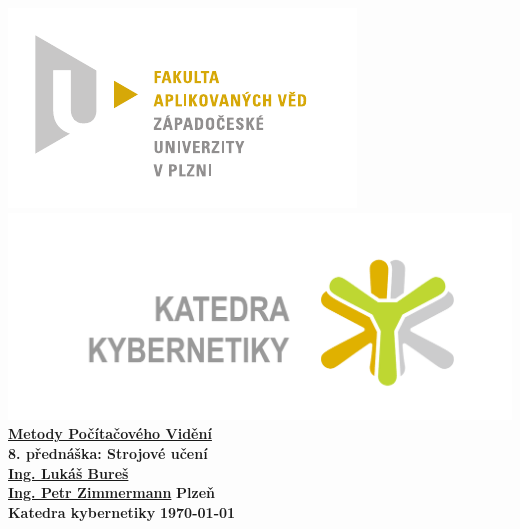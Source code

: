\documentclass[12pt, a4paper]{report}
\begin{document}
\begin{titlepage}
\begin{center}
	\includegraphics[trim = 0.6cm 0.5cm 0.9cm 0.5cm, scale=1]{./Img/FAV_logo_cz.pdf}
	\hspace*{\fill}
	\includegraphics[trim = 3.5cm 1.5cm 2.6cm 2cm, scale=0.295]{./Img/KKY_logo_cz.pdf}\\
	\vspace*{\fill}
	\textbf{\Huge{\href{http://www.kky.zcu.cz/cs/courses/mpv}{Metody Počítačového Vidění} \\ 8. přednáška: Strojové učení}}\\
	\vspace*{\fill}
	\textbf{\large{\href{mailto:LBures@kky.zcu.cz}{Ing. Lukáš Bureš}}} \hfill ~\\
	\textbf{\large{\href{mailto:PetrZim@kky.zcu.cz}{Ing. Petr Zimmermann}}} \hfill \textbf{\large{Plzeň}}\\
	\textbf{\large{Katedra kybernetiky}} \hfill \textbf{\large{\today}}
\end{center}
\end{titlepage}










\setcounter{page}{1}

\tableofcontents
\newpage

\setcounter{page}{1}










\end{document}
